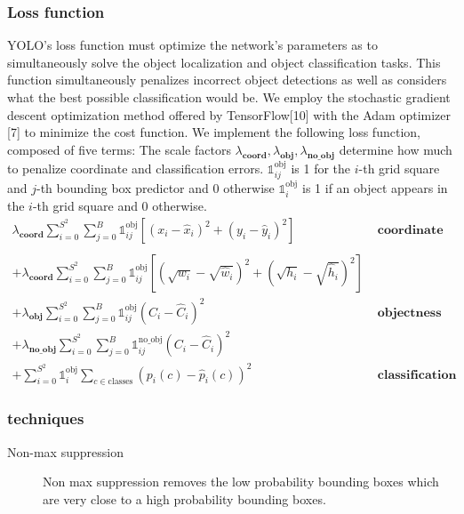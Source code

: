 \documentclass[a4paper]{article}
\begin{document}
\subsubsection*{Loss function}
YOLO’s loss function must optimize the network's parameters as to simultaneously solve the object localization and object classification tasks. This function
simultaneously penalizes incorrect object detections
as well as considers what the best possible classification
would be. We employ the stochastic gradient descent
optimization method offered by TensorFlow[10] with the
Adam optimizer [7] to minimize the cost function. We
implement the following loss function, composed of five
terms:
The scale factors $\lambda_\textbf{coord}, \lambda_\textbf{obj}, \lambda_\textbf{no\_obj}$ determine how much to penalize coordinate and classification errors. ${\mathbb{1}}_{ij}^{\text{obj}}$ is 1 for the $i$-th grid square and $j$-th bounding box predictor and 0 otherwise ${{\mathbb{1}}}_i^{\text{obj}}$ is 1 if an object appears in the $i$-th grid square and 0 otherwise.
\begin{align*}
\lambda_\textbf{coord}
\sum_{i = 0}^{S^2}
    \sum_{j = 0}^{B}
     {\mathbb{1}}_{ij}^{\text{obj}}
            \left[
            \left(
                x_i - \hat{x}_i
            \right)^2 +
            \left(
                y_i - \hat{y}_i
            \right)^2
            \right]&\textbf{\ coordinate loss}
\\\\
+ \lambda_\textbf{coord} 
\sum_{i = 0}^{S^2}
    \sum_{j = 0}^{B}
         {\mathbb{1}}_{ij}^{\text{obj}}
         \left[
        \left(
            \sqrt{w_i} - \sqrt{\hat{w}_i}
        \right)^2 +
        \left(
            \sqrt{h_i} - \sqrt{\hat{h}_i}
        \right)^2
        \right]\\
+ \lambda_\textbf{obj}\sum_{i = 0}^{S^2}
    \sum_{j = 0}^{B}
        {\mathbb{1}}_{ij}^{\text{obj}}
        \left(
            C_i - \hat{C}_i
        \right)^2&\textbf{\ objectness loss}
\\
+ \lambda_\textbf{no\_obj}
\sum_{i = 0}^{S^2}
    \sum_{j = 0}^{B}
    {\mathbb{1}}_{ij}^{\text{no\_obj}}
        \left(
            C_i - \hat{C}_i
        \right)^2\\ 
+ \sum_{i = 0}^{S^2}
{{\mathbb{1}}}_i^{\text{obj}}
    \sum_{c \in \textrm{classes}}
        \left(
            p_i(c) - \hat{p}_i(c)
        \right)^2&\textbf{\ classification loss}
\end{align*}


\subsubsection*{techniques}
\begin{description}
\item[Non-max suppression] Non max suppression removes the low probability bounding boxes which are very close to a high probability bounding boxes.
\end{description}
\end{document}
